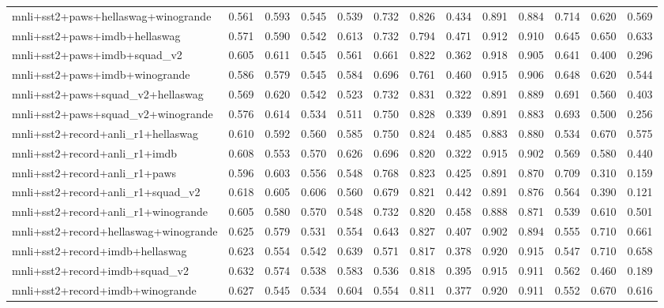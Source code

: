\begin{table}[t]
\begin{tabular}{lrrrrrrrrrrrr}
    mnli+sst2+paws+hellaswag+winogrande & 0.561 & 0.593 & 0.545 & 0.539 & 0.732 & 0.826 & 0.434 & 0.891 & 0.884 & 0.714 & 0.620 & 0.569 \\
    mnli+sst2+paws+imdb+hellaswag & 0.571 & 0.590 & 0.542 & 0.613 & 0.732 & 0.794 & 0.471 & 0.912 & 0.910 & 0.645 & 0.650 & 0.633 \\
    mnli+sst2+paws+imdb+squad\_v2 & 0.605 & 0.611 & 0.545 & 0.561 & 0.661 & 0.822 & 0.362 & 0.918 & 0.905 & 0.641 & 0.400 & 0.296 \\
    mnli+sst2+paws+imdb+winogrande & 0.586 & 0.579 & 0.545 & 0.584 & 0.696 & 0.761 & 0.460 & 0.915 & 0.906 & 0.648 & 0.620 & 0.544 \\
    mnli+sst2+paws+squad\_v2+hellaswag & 0.569 & 0.620 & 0.542 & 0.523 & 0.732 & 0.831 & 0.322 & 0.891 & 0.889 & 0.691 & 0.560 & 0.403 \\
    mnli+sst2+paws+squad\_v2+winogrande & 0.576 & 0.614 & 0.534 & 0.511 & 0.750 & 0.828 & 0.339 & 0.891 & 0.883 & 0.693 & 0.500 & 0.256 \\
    mnli+sst2+record+anli\_r1+hellaswag & 0.610 & 0.592 & 0.560 & 0.585 & 0.750 & 0.824 & 0.485 & 0.883 & 0.880 & 0.534 & 0.670 & 0.575 \\
    mnli+sst2+record+anli\_r1+imdb & 0.608 & 0.553 & 0.570 & 0.626 & 0.696 & 0.820 & 0.322 & 0.915 & 0.902 & 0.569 & 0.580 & 0.440 \\
    mnli+sst2+record+anli\_r1+paws & 0.596 & 0.603 & 0.556 & 0.548 & 0.768 & 0.823 & 0.425 & 0.891 & 0.870 & 0.709 & 0.310 & 0.159 \\
    mnli+sst2+record+anli\_r1+squad\_v2 & 0.618 & 0.605 & 0.606 & 0.560 & 0.679 & 0.821 & 0.442 & 0.891 & 0.876 & 0.564 & 0.390 & 0.121 \\
    mnli+sst2+record+anli\_r1+winogrande & 0.605 & 0.580 & 0.570 & 0.548 & 0.732 & 0.820 & 0.458 & 0.888 & 0.871 & 0.539 & 0.610 & 0.501 \\
    mnli+sst2+record+hellaswag+winogrande & 0.625 & 0.579 & 0.531 & 0.554 & 0.643 & 0.827 & 0.407 & 0.902 & 0.894 & 0.555 & 0.710 & 0.661 \\
    mnli+sst2+record+imdb+hellaswag & 0.623 & 0.554 & 0.542 & 0.639 & 0.571 & 0.817 & 0.378 & 0.920 & 0.915 & 0.547 & 0.710 & 0.658 \\
    mnli+sst2+record+imdb+squad\_v2 & 0.632 & 0.574 & 0.538 & 0.583 & 0.536 & 0.818 & 0.395 & 0.915 & 0.911 & 0.562 & 0.460 & 0.189 \\
    mnli+sst2+record+imdb+winogrande & 0.627 & 0.545 & 0.534 & 0.604 & 0.554 & 0.811 & 0.377 & 0.920 & 0.911 & 0.552 & 0.670 & 0.616 \\

\end{tabular}
\end{table}
